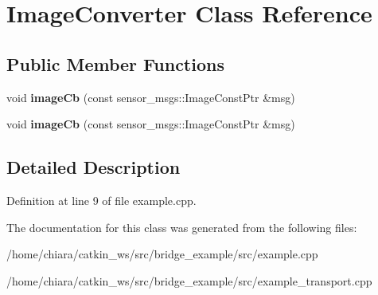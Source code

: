 \hypertarget{classImageConverter}{}\section{Image\+Converter Class Reference}
\label{classImageConverter}
\subsection*{Public Member Functions}
\begin{DoxyCompactItemize}
\item 
void {\bfseries image\+Cb} (const sensor\+\_\+msgs\+::\+Image\+Const\+Ptr \&msg)\hypertarget{classImageConverter_ab70b33720d4f8b71be32e9e17201d0a3}{}\label{classImageConverter_ab70b33720d4f8b71be32e9e17201d0a3}

\item 
void {\bfseries image\+Cb} (const sensor\+\_\+msgs\+::\+Image\+Const\+Ptr \&msg)\hypertarget{classImageConverter_ab70b33720d4f8b71be32e9e17201d0a3}{}\label{classImageConverter_ab70b33720d4f8b71be32e9e17201d0a3}

\end{DoxyCompactItemize}


\subsection{Detailed Description}


Definition at line 9 of file example.\+cpp.



The documentation for this class was generated from the following files\+:\begin{DoxyCompactItemize}
\item 
/home/chiara/catkin\+\_\+ws/src/bridge\+\_\+example/src/example.\+cpp\item 
/home/chiara/catkin\+\_\+ws/src/bridge\+\_\+example/src/example\+\_\+transport.\+cpp\end{DoxyCompactItemize}
